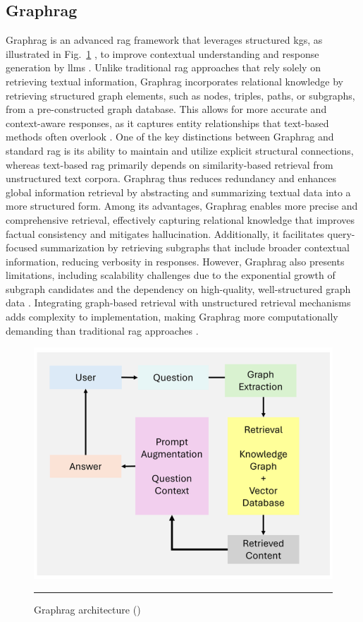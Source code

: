 \subsection*{Graph\gls{rag}}\label{sec:graph-rag}
Graph\gls{rag} is an advanced \gls{rag} framework that leverages structured \glspl{kg}, as illustrated in Fig.~\ref{fig:graph-rag-architecture} , to improve contextual understanding and response generation by \glspl{llm} \cite{peng2024graphragsurvey,singh2025}.
Unlike traditional \gls{rag} approaches that rely solely on retrieving textual information, Graph\gls{rag} incorporates relational knowledge by retrieving structured graph elements, such as nodes, triples, paths, or subgraphs, from a pre-constructed graph database.
This allows for more accurate and context-aware responses, as it captures entity relationships that text-based methods often overlook \cite{singh2025}.
One of the key distinctions between Graph\gls{rag} and standard \gls{rag} is its ability to maintain and utilize explicit structural connections, whereas text-based \gls{rag} primarily depends on similarity-based retrieval from unstructured text corpora.
Graph\gls{rag} thus reduces redundancy and enhances global information retrieval by abstracting and summarizing textual data into a more structured form.
Among its advantages, Graph\gls{rag} enables more precise and comprehensive retrieval, effectively capturing relational knowledge that improves factual consistency and mitigates hallucination.
Additionally, it facilitates query-focused summarization by retrieving subgraphs that include broader contextual information, reducing verbosity in responses.
However, Graph\gls{rag} also presents limitations, including scalability challenges due to the exponential growth of subgraph candidates and the dependency on high-quality, well-structured graph data \cite{singh2025}.
Integrating graph-based retrieval with unstructured retrieval mechanisms adds complexity to implementation, making Graph\gls{rag} more computationally demanding than traditional \gls{rag} approaches \cite{peng2024graphragsurvey,singh2025}.

\begin{figure}[htbp]
    \centering
 \includegraphics[width=.65\textwidth]{figures/literature-review/graphRAG.png}
     \rule{35em}{0.5pt}
    \caption{Graph\gls{rag} architecture (\textcite{singh2025})}
 \label{fig:graph-rag-architecture}
\end{figure}

